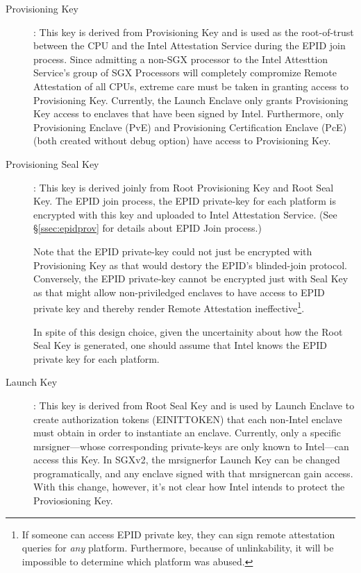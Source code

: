 \documentclass[11pt]{article}
\newcommand{\secref}[1]{\S\ref{#1}}
\newcommand{\mrsigner}{\textsf{mrsigner}}
\newcommand{\pve}{\textsf{PvE}}
\newcommand{\pce}{\textsf{PcE}}
\begin{document}
  \begin{description} 
    \item[Provisioning Key]: This key is derived from
      Provisioning Key and is used as the root-of-trust 
      between the CPU and the Intel Attestation Service during the 
      EPID join process. Since admitting a non-SGX processor to 
      the Intel Attesttion Service's group of SGX Processors will 
      completely compromize Remote Attestation of all CPUs, extreme 
      care must be taken in granting access to Provisioning Key. 
      Currently, the Launch Enclave only grants Provisioning Key 
      access to enclaves that have been signed by Intel. Furthermore,
      only Provisioning Enclave (\pve) and Provisioning Certification 
      Enclave (\pce) (both created without debug option) have access to 
      Provisioning Key.

    \item[Provisioning Seal Key]: This key is derived joinly from Root
      Provisioning Key and Root Seal Key. The EPID join process, the 
      EPID private-key for each platform is encrypted with this key
      and uploaded to Intel Attestation Service. (See \secref{ssec:epidprov}
      for details about EPID Join process.)

      Note that the EPID private-key could not just be encrypted with
      Provisioning Key as that would destory the EPID's blinded-join 
      protocol. Conversely, the EPID private-key cannot be encrypted
      just with Seal Key as that might allow non-priviledged enclaves
      to have access to EPID private key and thereby render Remote 
      Attestation ineffective\footnote{If someone can access EPID 
      private key, they can sign remote attestation queries for 
      \textit{any} platform. Furthermore, because of unlinkability, 
      it will be impossible to determine which platform was abused.}. 

      In spite of this design choice, given the uncertainity about 
      how the Root Seal Key is generated, one should assume that 
      Intel knows the EPID private key for each platform.

      \item[Launch Key]: This key is derived from Root Seal Key and 
      is used by Launch Enclave to create authorization tokens 
      (\textsf{EINITTOKEN}) that each non-Intel enclave must obtain 
      in order to instantiate an enclave. Currently, only a specific 
      \mrsigner---whose corresponding private-keys are only known 
      to Intel---can access this Key. In SGXv2, the \mrsigner for 
      Launch Key can be changed programatically, and any enclave 
      signed with that \mrsigner can gain access. With this change, 
      however, it's not clear how Intel intends to protect the 
      Proviosioning Key.


\end{description}
\end{document}
